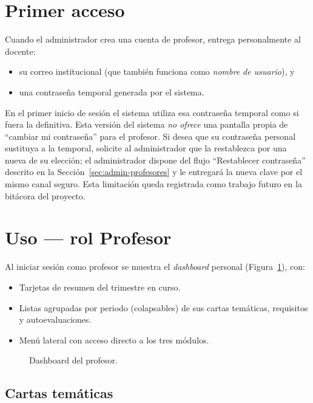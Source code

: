 \documentclass{computacion}
\begin{document}
\section{Primer acceso}

Cuando el administrador crea una cuenta de profesor, entrega personalmente al docente:

\begin{itemize}
    \item su correo institucional (que también funciona como \emph{nombre de usuario}), y
    \item una contraseña temporal generada por el sistema.
\end{itemize}

En el primer inicio de sesión el sistema utiliza esa contraseña temporal como si fuera la definitiva. Esta versión del sistema \emph{no ofrece} una pantalla propia de ``cambiar mi contraseña'' para el profesor. Si desea que su contraseña personal sustituya a la temporal, solicite al administrador que la restablezca por una nueva de su elección; el administrador dispone del flujo ``Restablecer contraseña'' descrito en la Sección~\ref{sec:admin-profesores} y le entregará la nueva clave por el mismo canal seguro. Esta limitación queda registrada como trabajo futuro en la bitácora del proyecto.

\section{Uso — rol Profesor}

Al iniciar sesión como profesor se muestra el \emph{dashboard} personal (Figura~\ref{fig:m-docente-dash}), con:
\begin{itemize}
    \item Tarjetas de resumen del trimestre en curso.
    \item Listas agrupadas por periodo (colapsables) de sus cartas temáticas, requisitos y autoevaluaciones.
    \item Menú lateral con acceso directo a los tres módulos.
\end{itemize}

\begin{figure}[!ht]
    \centering
    \caption{Dashboard del profesor.}
    \label{fig:m-docente-dash}
\end{figure}

\subsection{Cartas temáticas}
\end{document}
